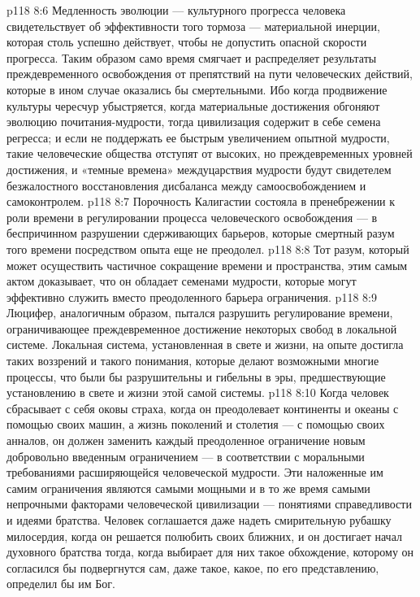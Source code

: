 \vs p118 8:6 Медленность эволюции --- культурного прогресса человека свидетельствует об эффективности того тормоза --- материальной инерции, которая столь успешно действует, чтобы не допустить опасной скорости прогресса. Таким образом само время смягчает и распределяет результаты преждевременного освобождения от препятствий на пути человеческих действий, которые в ином случае оказались бы смертельными. Ибо когда продвижение культуры чересчур убыстряется, когда материальные достижения обгоняют эволюцию почитания\hyp{}мудрости, тогда цивилизация содержит в себе семена регресса; и если не поддержать ее быстрым увеличением опытной мудрости, такие человеческие общества отступят от высоких, но преждевременных уровней достижения, и «темные времена» междуцарствия мудрости будут свидетелем безжалостного восстановления дисбаланса между самоосвобождением и самоконтролем.
\vs p118 8:7 Порочность Калигастии состояла в пренебрежении к роли времени в регулировании процесса человеческого освобождения --- в беспричинном разрушении сдерживающих барьеров, которые смертный разум того времени посредством опыта еще не преодолел.
\vs p118 8:8 Тот разум, который может осуществить частичное сокращение времени и пространства, этим самым актом доказывает, что он обладает семенами мудрости, которые могут эффективно служить вместо преодоленного барьера ограничения.
\vs p118 8:9 Люцифер, аналогичным образом, пытался разрушить регулирование времени, ограничивающее преждевременное достижение некоторых свобод в локальной системе. Локальная система, установленная в свете и жизни, на опыте достигла таких воззрений и такого понимания, которые делают возможными многие процессы, что были бы разрушительны и гибельны в эры, предшествующие установлению в свете и жизни этой самой системы.
\vs p118 8:10 Когда человек сбрасывает с себя оковы страха, когда он преодолевает континенты и океаны с помощью своих машин, а жизнь поколений и столетия --- с помощью своих анналов, он должен заменить каждый преодоленное ограничение новым добровольно введенным ограничением --- в соответствии с моральными требованиями расширяющейся человеческой мудрости. Эти наложенные им самим ограничения являются самыми мощными и в то же время самыми непрочными факторами человеческой цивилизации --- понятиями справедливости и идеями братства. Человек соглашается даже надеть смирительную рубашку милосердия, когда он решается полюбить своих ближних, и он достигает начал духовного братства тогда, когда выбирает для них такое обхождение, которому он согласился бы подвергнутся сам, даже такое, какое, по его представлению, определил бы им Бог.

